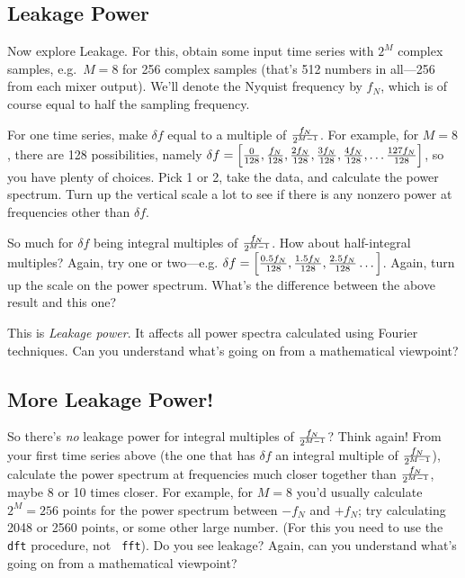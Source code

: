 \documentclass[11pt,preprint]{aastex}
\begin{document}
\subsection{Leakage Power}

Now explore Leakage. For this, obtain some input time series with $2^M$
complex samples, e.g.\ $M=8$ for 256 complex samples (that's 512 numbers
in all---256 from each mixer output). We'll denote the Nyquist frequency
by $f_N$, which is of course equal to half the sampling frequency.

For one time series, make $\delta f$ equal to a multiple of $f_N \over
{2^{M-1}}$. For example, for $M=8$, there are 128 possibilities, namely
$\delta f = \left[ {0 \over 128},{f_N \over 128},{2 f_N \over 128},{3
f_N \over 128},{4 f_N \over 128}, \dots {127 f_N \over 128}\right]$, so
you have plenty of choices. Pick 1 or 2, take the data, and calculate
the power spectrum. Turn up the vertical scale a lot to see if there is
any nonzero power at frequencies other than $\delta f$.

So much for $\delta f$ being integral multiples of $f_N \over
2^{M-1}$. How about half-integral multiples? Again, try one or
two---e.g. $\delta f = \left[ {0.5 f_N \over 128},{1.5 f_N \over
128},{2.5 f_N \over 128}\dots \right]$.  Again, turn up the scale on the
power spectrum. What's the difference between the above result and this
one?

This is {\it Leakage power}. It affects all power spectra calculated
using Fourier techniques. Can you understand what's going on from a
mathematical viewpoint?

\subsection{More Leakage Power!} \label{leakage}

So there's {\it no} leakage power for integral multiples of $f_N \over
2^{M-1}$? Think again! From your first time series above (the one that
has $\delta f$ an integral multiple of $f_N \over 2^{M-1}$), calculate
the power spectrum at frequencies much closer together than $f_N \over
2^{M-1}$, maybe 8 or 10 times closer. For example, for $M=8$ you'd
usually calculate $2^M=256$ points for the power spectrum between $-f_N$
and $+f_N$; try calculating 2048 or 2560 points, or some other large
number. (For this you need to use the {\tt dft} procedure, not {\tt
fft}). Do you see leakage? Again, can you understand what's going on
from a mathematical viewpoint?
\end{document}
